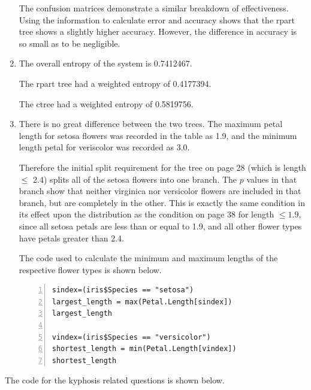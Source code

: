 \documentclass[11pt]{article}
\begin{document}
\begin{enumerate}
The confusion matrices demonstrate a similar breakdown of effectiveness. 
Using the information to calculate error and accuracy shows that the 
rpart tree shows a slightly higher accuracy. However, the difference in 
accuracy is so small as to be negligible. 

\item 
The overall entropy of the system is 0.7412467. 

The rpart tree had a weighted entropy of 
0.4177394.

The ctree had a weighted entropy of 
0.5819756.

\item There is no great difference between the two trees. 
The maximum petal length for setosa flowers was recorded in 
the table as 1.9, and the minimum length petal for veriscolor 
was recorded as 3.0.

Therefore the initial split requirement for the tree on page 28 
(which is length $\le$ 2.4) splits all of the setosa flowers into one branch. 
The $p$ values in that branch show that neither virginica nor versicolor 
flowers are included in that branch, but are completely in the other. 
This is exactly the same condition in its effect upon the distribution as 
the condition on page 38 for length $\le 1.9$, since all setosa petals are 
less than or equal to 1.9, and all other flower types have petals greater than 2.4.

The code used to calculate the minimum and maximum lengths of the respective flower 
types is shown below.

\begin{Verbatim}[numbers=left]
sindex=(iris$Species == "setosa")
largest_length = max(Petal.Length[sindex])
largest_length

vindex=(iris$Species == "versicolor")
shortest_length = min(Petal.Length[vindex])
shortest_length
\end{Verbatim}

\end{enumerate}

The code for the kyphosis related questions is shown below. 
\end{document}
